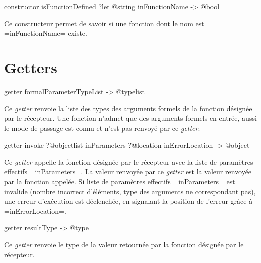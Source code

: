 
\begin{galgas3}
constructor isFunctionDefined ?let @string inFunctionName -> @bool
\end{galgas3}

Ce constructeur permet de savoir si une fonction dont le nom est \ggst=inFunctionName= existe.






\section{Getters}



\begin{galgas3}
getter formalParameterTypeList -> @typelist
\end{galgas3}

Ce \emph{getter} renvoie la liste des types des arguments formels de la fonction désignée par le récepteur. Une fonction n'admet que des arguments formels en entrée, aussi le mode de passage est connu et n'est pas renvoyé par ce \emph{getter}.





\begin{galgas3}
getter invoke ?@objectlist inParameters
              ?@location inErrorLocation -> @object
\end{galgas3}

Ce \emph{getter} appelle la fonction désignée par le récepteur avec la liste de paramètres effectifs \ggst=inParameters=. La valeur renvoyée par ce \emph{getter} est la valeur renvoyée par la fonction appelée. Si liste de paramètres effectifs \ggst=inParameters= est invalide (nombre incorrect d'éléments, type des arguments ne correspondant pas), une erreur d'exécution est déclenchée, en signalant la position de l'erreur grâce à \ggst=inErrorLocation=.






\begin{galgas3}
getter resultType -> @type
\end{galgas3}

Ce \emph{getter} renvoie le type de la valeur retournée par la fonction désignée par le récepteur.





